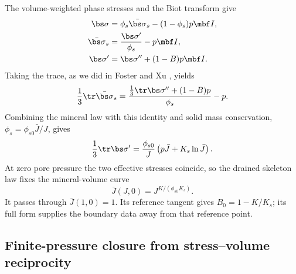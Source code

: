 The volume-weighted phase stresses and the Biot transform give
\begin{align}
 \bs\sigma&=\phi_s\bar{\bs\sigma}_s-(1-\phi_s)p\mbf I,
 \label{eq:trace-phase-stress-decomposition}\\
 \bar{\bs\sigma}_s&=\frac{\bs\sigma^{\prime}}{\phi_s}-p\mbf I,
 \label{eq:trace-intrinsic-solid-stress}\\
 \bs\sigma^{\prime}&=\bs\sigma^{\prime\prime}+(1-B)p\mbf I.
 \label{eq:trace-single-prime-transform}
\end{align}
Taking the trace, as we did in Foster and Xu \citep[App.~B]{fosterxu2025}, yields
\begin{equation}
 \frac13\tr\bar{\bs\sigma}_s
 =\frac{\tfrac13\tr\bs\sigma^{\prime\prime}+(1-B)p}{\phi_s}-p.
 \label{eq:trace-intrinsic-solid-mean-stress-transform}
\end{equation}
Combining the mineral law with this identity and solid mass conservation,
\(\phi_s=\phi_{s0}\bar J/J\), gives
\begin{equation}
 \frac13\tr\bs\sigma^{\prime}
 =\frac{\phi_{s0}}{J}\left(p\bar J+K_s\ln\bar J\right).
 \label{eq:trace-single-prime-mineral-law}
\end{equation}
At zero pore pressure the two effective stresses coincide, so the drained
skeleton law fixes the mineral-volume curve
\begin{equation}
 \bar J(J,0)=J^{K/(\phi_{s0}K_s)}.
 \label{eq:trace-drained-mineral-curve}
\end{equation}
It passes through \(\bar J(1,0)=1\).  Its reference tangent gives
\(B_0=1-K/K_s\); its full form supplies the boundary data away from that
reference point.

\subsection{Finite-pressure closure from stress--volume reciprocity}

